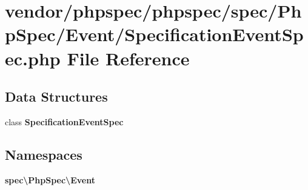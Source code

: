 \section{vendor/phpspec/phpspec/spec/\+Php\+Spec/\+Event/\+Specification\+Event\+Spec.php File Reference}
\label{_specification_event_spec_8php}
\subsection*{Data Structures}
\begin{DoxyCompactItemize}
\item 
class {\bf Specification\+Event\+Spec}
\end{DoxyCompactItemize}
\subsection*{Namespaces}
\begin{DoxyCompactItemize}
\item 
 {\bf spec\textbackslash{}\+Php\+Spec\textbackslash{}\+Event}
\end{DoxyCompactItemize}
